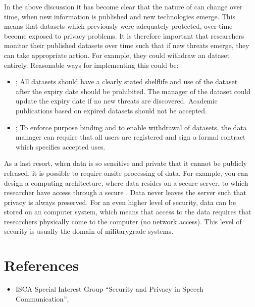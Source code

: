 \documentclass[letterpaper,10pt,english]{jupyterBook}
\begin{document}
\sphinxAtStartPar
In the above discussion it has become clear that the nature of  can change over time, when new information is published
and new technologies emerge. This means that datasets which previously
were adequately protected, over time become exposed to privacy problems.
It is therefore important that researchers monitor their published
datasets over time such that if new threats emerge, they can take
appropriate action. For example, they could withdraw an dataset
entirely. Reasonable ways for implementing this could be:
\begin{itemize}
\item {} 
\sphinxAtStartPar
{}; All datasets should have a clearly stated shelf\sphinxhyphen{}life
and use of the dataset after the expiry date should be prohibited.
The manager of the dataset could update the expiry date if no new
threats are discovered. Academic publications based on expired
datasets should not be accepted.

\item {} 
\sphinxAtStartPar
{}; To enforce purpose binding and to
enable withdrawal of datasets, the data manager can require that all
users are registered and sign a formal contract which specifies
accepted uses.

\end{itemize}

\sphinxAtStartPar
As a last resort, when data is so sensitive and private that it cannot
be publicly released, it is possible to require on\sphinxhyphen{}site processing of
data. For example, you can design a computing architecture, where data
resides on a secure server, to which researcher have access through a
secure
.
Data never leaves the server such that privacy is always preserved. For
an even higher level of security, data can be stored on an
computer system, which means that access to the data requires that
researchers physically come to the computer (no network access). This
level of security is usually the domain of military\sphinxhyphen{}grade systems.


\section{References}
\label{\detokenize{Security_and_privacy:references}}\begin{itemize}
\item {} 
\sphinxAtStartPar
ISCA Special Interest Group “Security and Privacy in Speech
Communication”, 

\end{itemize}
\end{document}
